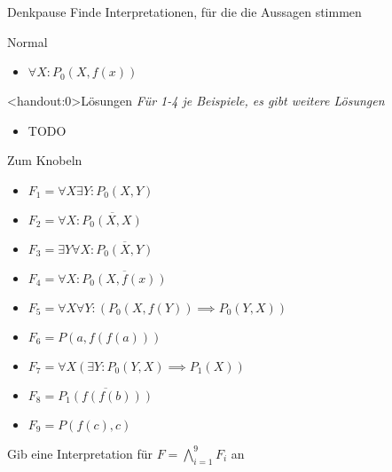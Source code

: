 {
\begin{frame}{Denkpause}
    Finde Interpretationen, für die die Aussagen stimmen
    \begin{block}{Normal}
        \begin{itemize}
            \item $\forall X: {P_0(X,f(x))}$
        \end{itemize}
    \end{block}
\end{frame}

\begin{frame}<handout:0>{Lösungen}
    \textit{Für 1-4 je Beispiele, es gibt weitere Lösungen}
    \begin{itemize}[<+- | alert@+>]
        \item TODO
    \end{itemize}

\end{frame}

\begin{frame}{Zum Knobeln}
    \small
    \begin{block}{}
        \begin{multicols}{2}
            \begin{itemize}
                \item $F_1 = \forall X \exists Y: P_0(X,Y)$
                \item $F_2 = \forall X: \overline{P_0(X,X)}$
                \item $F_3 = \exists Y \forall X: \overline{P_0(X,Y)}$
                \item $F_4 = \forall X: \overline{P_0(X,f(x))}$
                \item {\scriptsize$F_5 = \forall X \forall Y: (P_0(X,f(Y)) \implies P_0(Y,X))$}
                \item $F_6 = P(a, f(f(a)))$
                \item $F_7 = \forall X (\exists Y: P_0(Y,X)\implies P_1(X))$
                \item $F_8 = \overline{P_1(f(f(b)))}$
                \item $F_9 = P(f(c),c)$
            \end{itemize}
        \end{multicols}
        Gib eine Interpretation für $F = \bigwedge_{i=1}^9 F_i$ an
    \end{block}
\end{frame}
}